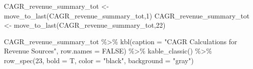 \documentclass[
  letterpaper,
  DIV=11,
  numbers=noendperiod]{scrreport}
\newenvironment{Shaded}{\begin{snugshade}}{\end{snugshade}}
\newcommand{\AttributeTok}[1]{\textcolor[rgb]{0.40,0.45,0.13}{#1}}
\newcommand{\ConstantTok}[1]{\textcolor[rgb]{0.56,0.35,0.01}{#1}}
\newcommand{\DecValTok}[1]{\textcolor[rgb]{0.68,0.00,0.00}{#1}}
\newcommand{\FunctionTok}[1]{\textcolor[rgb]{0.28,0.35,0.67}{#1}}
\newcommand{\NormalTok}[1]{\textcolor[rgb]{0.00,0.23,0.31}{#1}}
\newcommand{\OtherTok}[1]{\textcolor[rgb]{0.00,0.23,0.31}{#1}}
\newcommand{\SpecialCharTok}[1]{\textcolor[rgb]{0.37,0.37,0.37}{#1}}
\newcommand{\StringTok}[1]{\textcolor[rgb]{0.13,0.47,0.30}{#1}}
\begin{document}
\begin{Shaded}
\begin{Highlighting}[]
\NormalTok{CAGR\_revenue\_summary\_tot }\OtherTok{\textless{}{-}} \FunctionTok{move\_to\_last}\NormalTok{(CAGR\_revenue\_summary\_tot,}\DecValTok{1}\NormalTok{)}
\NormalTok{CAGR\_revenue\_summary\_tot }\OtherTok{\textless{}{-}} \FunctionTok{move\_to\_last}\NormalTok{(CAGR\_revenue\_summary\_tot,}\DecValTok{22}\NormalTok{)}

\NormalTok{CAGR\_revenue\_summary\_tot }\SpecialCharTok{\%\textgreater{}\%} 
  \FunctionTok{kbl}\NormalTok{(}\AttributeTok{caption =} \StringTok{"CAGR Calculations for Revenue Sources"}\NormalTok{, }\AttributeTok{row.names =} \ConstantTok{FALSE}\NormalTok{) }\SpecialCharTok{\%\textgreater{}\%} 
     \FunctionTok{kable\_classic}\NormalTok{() }\SpecialCharTok{\%\textgreater{}\%}
    \FunctionTok{row\_spec}\NormalTok{(}\DecValTok{23}\NormalTok{, }\AttributeTok{bold =}\NormalTok{ T, }\AttributeTok{color =} \StringTok{"black"}\NormalTok{, }\AttributeTok{background =} \StringTok{"gray"}\NormalTok{)}
\end{Highlighting}
\end{Shaded}
\end{document}
